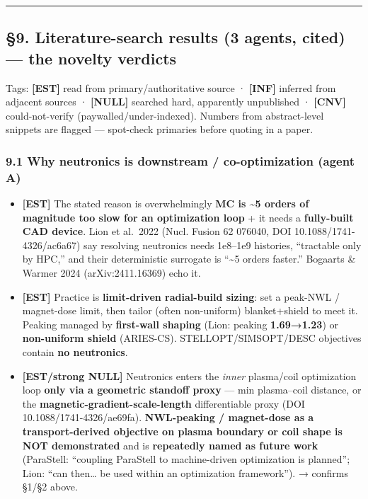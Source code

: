 \documentclass[
]{article}
\providecommand{\tightlist}{%
  \setlength{\itemsep}{0pt}\setlength{\parskip}{0pt}}
\begin{document}
\begin{center}\rule{0.5\linewidth}{0.5pt}\end{center}

\subsection{§9. Literature-search results (3 agents, cited) --- the
novelty
verdicts}\label{literature-search-results-3-agents-cited-the-novelty-verdicts}

Tags: \textbf{{[}EST{]}} read from primary/authoritative source ·
\textbf{{[}INF{]}} inferred from adjacent sources · \textbf{{[}NULL{]}}
searched hard, apparently unpublished · \textbf{{[}CNV{]}}
could-not-verify (paywalled/under-indexed). Numbers from abstract-level
snippets are flagged --- spot-check primaries before quoting in a paper.

\subsubsection{9.1 Why neutronics is downstream / co-optimization (agent
A)}\label{why-neutronics-is-downstream-co-optimization-agent-a}

\begin{itemize}
\tightlist
\item
  \textbf{{[}EST{]}} The stated reason is overwhelmingly \textbf{MC is
  \textasciitilde5 orders of magnitude too slow for an optimization
  loop} + it needs a \textbf{fully-built CAD device}. Lion et al.~2022
  (Nucl. Fusion 62 076040, DOI 10.1088/1741-4326/ac6a67) say resolving
  neutronics needs 1e8--1e9 histories, ``tractable only by HPC,'' and
  their deterministic surrogate is ``\textasciitilde5 orders faster.''
  Bogaarts \& Warmer 2024 (arXiv:2411.16369) echo it.
\item
  \textbf{{[}EST{]}} Practice is \textbf{limit-driven radial-build
  sizing}: set a peak-NWL / magnet-dose limit, then tailor (often
  non-uniform) blanket+shield to meet it. Peaking managed by
  \textbf{first-wall shaping} (Lion: peaking \textbf{1.69→1.23}) or
  \textbf{non-uniform shield} (ARIES-CS). STELLOPT/SIMSOPT/DESC
  objectives contain \textbf{no neutronics}.
\item
  \textbf{{[}EST/strong NULL{]}} Neutronics enters the \emph{inner}
  plasma/coil optimization loop \textbf{only via a geometric standoff
  proxy} --- min plasma--coil distance, or the
  \textbf{magnetic-gradient-scale-length} differentiable proxy (DOI
  10.1088/1741-4326/ae69fa). \textbf{NWL-peaking / magnet-dose as a
  transport-derived objective on plasma boundary or coil shape is NOT
  demonstrated} and is \textbf{repeatedly named as future work}
  (ParaStell: ``coupling ParaStell to machine-driven optimization is
  planned''; Lion: ``can then\ldots{} be used within an optimization
  framework''). → confirms §1/§2 above.
\end{itemize}
\end{document}
